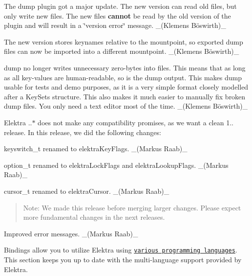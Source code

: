 \begin{DoxyItemize}
\item The {\ttfamily dump} plugin got a major update. The new version can read old files, but only write new files. The new files {\bfseries cannot} be read by the old version of the plugin and will result in a \char`\"{}version error\char`\"{} message. \+\_\+(Klemens Böswirth)\+\_\+
\item The new version stores keynames relative to the mountpoint, so exported {\ttfamily dump} files can now be imported into a different mountpoint. \+\_\+(Klemens Böswirth)\+\_\+
\item {\ttfamily dump} no longer writes unnecessary zero-\/bytes into files. This means that as long as all key-\/values are human-\/readable, so is the {\ttfamily dump} output. This makes {\ttfamily dump} usable for tests and demo purposes, as it is a very simple format closely modelled after a Key\+Set\textquotesingle{}s structure. This also makes it much easier to manually fix broken {\ttfamily dump} files. You only need a text editor most of the time. \+\_\+(Klemens Böswirth)\+\_\+
\end{DoxyItemize}

Elektra {..$\ast$} does not make any compatibility promises, as we want a clean 1.. release. In this release, we did the following changes\+:


\begin{DoxyItemize}
\item {\ttfamily keyswitch\+\_\+t} renamed to elektra\+Key\+Flags. \+\_\+(\+Markus Raab)\+\_\+
\item {\ttfamily option\+\_\+t} renamed to elektra\+Lock\+Flags and elektra\+Lookup\+Flags. \+\_\+(\+Markus Raab)\+\_\+
\item {\ttfamily cursor\+\_\+t} renamed to elektra\+Cursor. \+\_\+(\+Markus Raab)\+\_\+
\end{DoxyItemize}

\begin{quote}
Note\+: We made this release before merging larger changes. Please expect more fundamental changes in the next releases. \end{quote}



\begin{DoxyItemize}
\item Improved error messages. \+\_\+(\+Markus Raab)\+\_\+
\end{DoxyItemize}

Bindings allow you to utilize Elektra using \href{https://www.libelektra.org/bindings/readme}{\tt various programming languages}. This section keeps you up to date with the multi-\/language support provided by Elektra.


